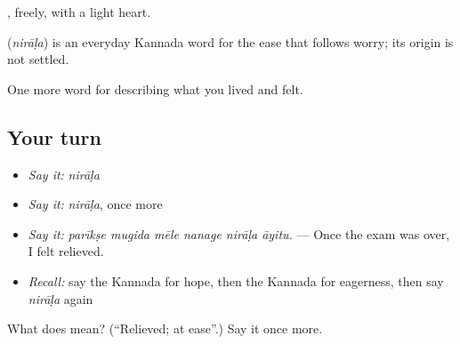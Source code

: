 , freely, with a light heart.

\begin{cousinweb}
\textbf{} (\emph{nirāḷa}) is an everyday Kannada word for the ease that follows worry; its origin is not settled.
\end{cousinweb}

\begin{grammarlens}[title={What you've built}]
One more word for describing what you lived and felt.
\end{grammarlens}

\subsection*{Your turn}
\begin{itemize}
\raggedright
  \item \emph{Say it:} \emph{nirāḷa}
  \item \emph{Say it:} \emph{nirāḷa}, once more
  \item \emph{Say it:} \emph{parīkṣe mugida mēle nanage nirāḷa āyitu.} — Once the exam was over, I felt relieved.
  \item \emph{Recall:} say the Kannada for hope, then the Kannada for eagerness, then say \emph{nirāḷa} again
\end{itemize}

\begin{tcolorbox}[breakable,colback=teal!4,colframe=teal!35!black,title={Before you move on}]
What does  mean? (\textquotedblleft{}Relieved; at ease\textquotedblright{}.) Say it once more.
\end{tcolorbox}
